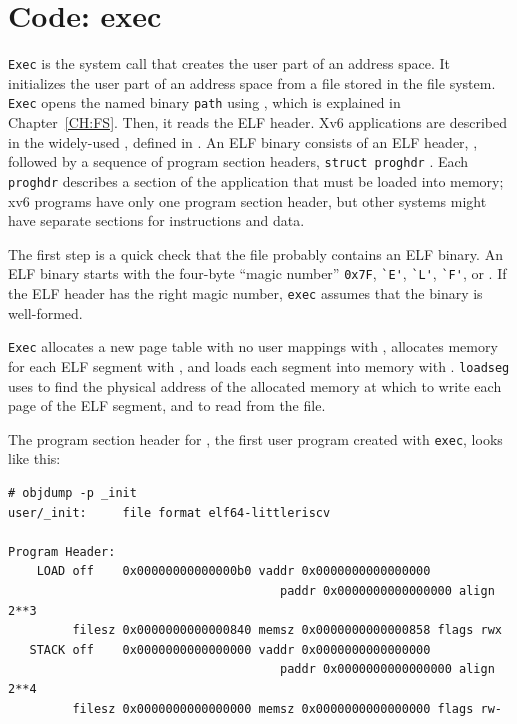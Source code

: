 \section{Code: exec}
\lstinline{Exec}
is the system call that creates the user part of an address space.  It
initializes the user part of an address space from a file stored in the file
system.
\lstinline{Exec}
opens the named binary
\lstinline{path}
using
,
which is explained in Chapter~\ref{CH:FS}.
Then, it reads the ELF header. Xv6 applications are described in the widely-used
,
defined in
.
An ELF binary consists of an ELF header,
,
followed by a sequence of program section headers,
\lstinline{struct proghdr}
.
Each
\lstinline{proghdr}
describes a section of the application that must be loaded into memory;
xv6 programs have only one program section header, but
other systems might have separate sections
for instructions and data.

The first step is a quick check that the file probably contains an
ELF binary.
An ELF binary starts with the four-byte ``magic number''
\lstinline{0x7F},
\lstinline{`E'},
\lstinline{`L'},
\lstinline{`F'},
or
.
If the ELF header has the right magic number,
\lstinline{exec}
assumes that the binary is well-formed.

\lstinline{Exec}
allocates a new page table with no user mappings with
,
allocates memory for each ELF segment with
,
and loads each segment into memory with
.
\lstinline{loadseg}
uses
to find the physical address of the allocated memory at which to write
each page of the ELF segment, and
to read from the file.

The program section header for
,
the first user program created with
\lstinline{exec},
looks like this:
\begin{footnotesize}
\begin{verbatim}
# objdump -p _init
user/_init:     file format elf64-littleriscv

Program Header:
    LOAD off    0x00000000000000b0 vaddr 0x0000000000000000 
                                      paddr 0x0000000000000000 align 2**3
         filesz 0x0000000000000840 memsz 0x0000000000000858 flags rwx
   STACK off    0x0000000000000000 vaddr 0x0000000000000000 
                                      paddr 0x0000000000000000 align 2**4
         filesz 0x0000000000000000 memsz 0x0000000000000000 flags rw-
\end{verbatim}
\end{footnotesize}

